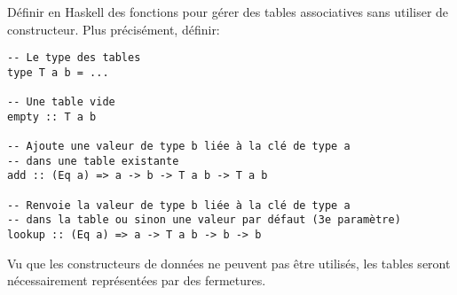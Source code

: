 \begin{Exercise}[title={Tables associatives en utilisant des fermetures}]
  \label{ex:tables_fermetures}
  Définir en Haskell des fonctions pour gérer des tables associatives
sans utiliser de constructeur.  Plus précisément, définir:
\begin{verbatim}
-- Le type des tables
type T a b = ... 

-- Une table vide
empty :: T a b   

-- Ajoute une valeur de type b liée à la clé de type a
-- dans une table existante
add :: (Eq a) => a -> b -> T a b -> T a b 

-- Renvoie la valeur de type b liée à la clé de type a 
-- dans la table ou sinon une valeur par défaut (3e paramètre)
lookup :: (Eq a) => a -> T a b -> b -> b 
\end{verbatim}

Vu que les constructeurs de données ne peuvent pas être utilisés, les
tables seront nécessairement représentées par des fermetures.
\end{Exercise}

\begin{Answer}[ref={ex:tables_fermetures}]
\end{Answer}